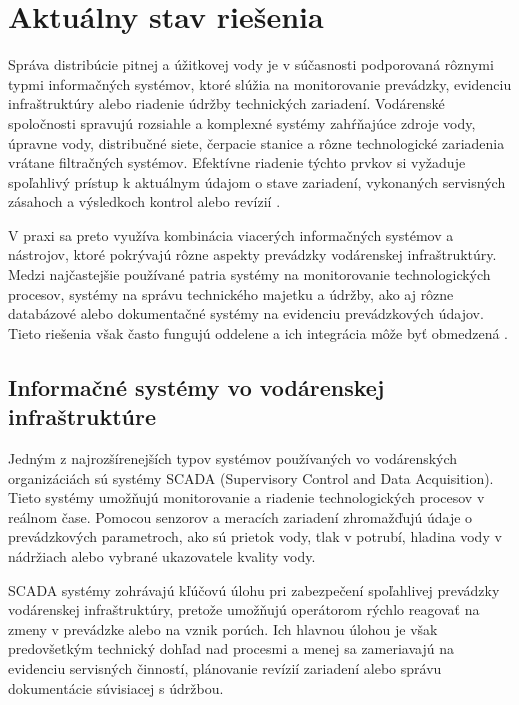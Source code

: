 
\chapter{Aktuálny stav riešenia}

Správa distribúcie pitnej a úžitkovej vody je v súčasnosti podporovaná rôznymi typmi informačných systémov, ktoré slúžia na monitorovanie prevádzky, evidenciu infraštruktúry alebo riadenie údržby technických zariadení. Vodárenské spoločnosti spravujú rozsiahle a komplexné systémy zahŕňajúce zdroje vody, úpravne vody, distribučné siete, čerpacie stanice a rôzne technologické zariadenia vrátane filtračných systémov. Efektívne riadenie týchto prvkov si vyžaduje spoľahlivý prístup k aktuálnym údajom o stave zariadení, vykonaných servisných zásahoch a výsledkoch kontrol alebo revízií \cite{CarricoFerreira2021}.

V praxi sa preto využíva kombinácia viacerých informačných systémov a nástrojov, ktoré pokrývajú rôzne aspekty prevádzky vodárenskej infraštruktúry. Medzi najčastejšie používané patria systémy na monitorovanie technologických procesov, systémy na správu technického majetku a údržby, ako aj rôzne databázové alebo dokumentačné systémy na evidenciu prevádzkových údajov. Tieto riešenia však často fungujú oddelene a ich integrácia môže byť obmedzená \cite{CarricoFerreira2021}.

\section{Informačné systémy vo vodárenskej infraštruktúre}

Jedným z najrozšírenejších typov systémov používaných vo vodárenských organizáciách sú systémy SCADA (Supervisory Control and Data Acquisition). Tieto systémy umožňujú monitorovanie a riadenie technologických procesov v reálnom čase. Pomocou senzorov a meracích zariadení zhromažďujú údaje o prevádzkových parametroch, ako sú prietok vody, tlak v potrubí, hladina vody v nádržiach alebo vybrané ukazovatele kvality vody.

SCADA systémy zohrávajú kľúčovú úlohu pri zabezpečení spoľahlivej prevádzky vodárenskej infraštruktúry, pretože umožňujú operátorom rýchlo reagovať na zmeny v prevádzke alebo na vznik porúch. Ich hlavnou úlohou je však predovšetkým technický dohľad nad procesmi a menej sa zameriavajú na evidenciu servisných činností, plánovanie revízií zariadení alebo správu dokumentácie súvisiacej s údržbou.

